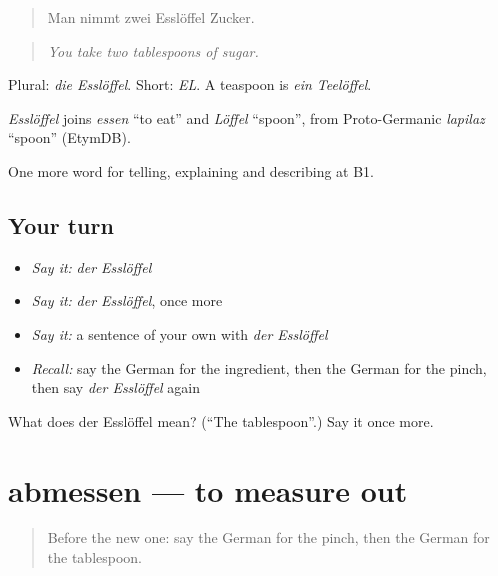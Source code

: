 \begin{quote}
Man nimmt zwei Esslöffel Zucker.
\end{quote}

\begin{quote}
\emph{You take two tablespoons of sugar.}
\end{quote}

Plural: \emph{die Esslöffel}. Short: \emph{EL}. A teaspoon is \emph{ein Teelöffel}.

\begin{cousinweb}
\emph{Esslöffel} joins \emph{essen} \textquotedblleft{}to eat\textquotedblright{} and \emph{Löffel} \textquotedblleft{}spoon\textquotedblright{}, from Proto-Germanic \emph{lapilaz} \textquotedblleft{}spoon\textquotedblright{} (EtymDB).
\end{cousinweb}

\begin{grammarlens}[title={What you've built}]
One more word for telling, explaining and describing at B1.
\end{grammarlens}

\subsection*{Your turn}
\begin{itemize}
\raggedright
  \item \emph{Say it:} \emph{der Esslöffel}
  \item \emph{Say it:} \emph{der Esslöffel}, once more
  \item \emph{Say it:} a sentence of your own with \emph{der Esslöffel}
  \item \emph{Recall:} say the German for the ingredient, then the German for the pinch, then say \emph{der Esslöffel} again
\end{itemize}

\begin{tcolorbox}[breakable,colback=teal!4,colframe=teal!35!black,title={Before you move on}]
What does der Esslöffel mean? (\textquotedblleft{}The tablespoon\textquotedblright{}.) Say it once more.
\end{tcolorbox}
\section[abmessen]{abmessen — to measure out}

\label{lesson:GE-C322-abmessen}



\begin{quote}
Before the new one: say the German for the pinch, then the German for the tablespoon.
\end{quote}

